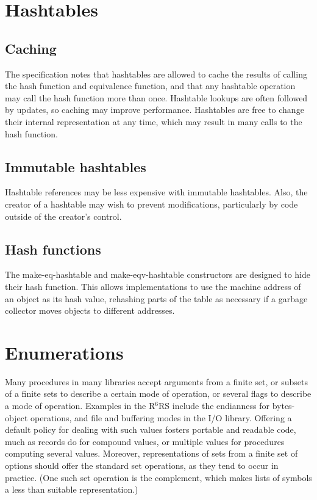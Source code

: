 \documentclass[twoside,twocolumn]{algol60}
\newcommand{\rn}[1]{R$^{#1}$RS}
\begin{document}
\chapter{Hashtables}

\section{Caching}

The specification notes that hashtables are allowed to cache the
results of calling the hash function and equivalence function, and
that any hashtable operation may call the hash function more than
once.  Hashtable lookups are often followed by updates, so caching may
improve performance.  Hashtables are free to change their internal
representation at any time, which may result in many calls to the hash
function.

\section{Immutable hashtables}

Hashtable references may be less expensive with immutable hashtables.
Also, the creator of a hashtable may wish to prevent 
modifications, particularly by code outside of the creator's 
control.

\section{Hash functions}

The {\cf make-eq-hashtable} and {\cf make-eqv-hashtable} constructors
are designed to hide their hash function.  This allows implementations
to use the machine address of an object as its hash value, rehashing
parts of the table as necessary if a garbage collector moves
objects to different addresses.

\chapter{Enumerations}

Many procedures in many libraries accept arguments from a finite set,
or subsets of a finite sets to describe a certain mode of operation,
or several flags to describe a mode of operation.  Examples in the
\rn{6} include the endianness for bytes-object operations, and file
and buffering modes in the I/O library.  Offering a default policy for
dealing with such values fosters portable and readable code, much as
records do for compound values, or multiple values for procedures
computing several values.  Moreover, representations of sets from a
finite set of options should offer the standard set operations, as
they tend to occur in practice.  (One such set operation is the
complement, which makes lists of symbols a less than suitable
representation.)
\end{document}
